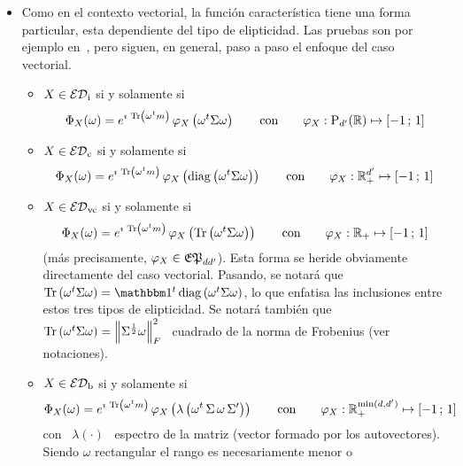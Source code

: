 \begin{itemize}
%
\item Como  en el  contexto vectorial, la  funci\'on caracter\'istica  tiene una
  forma particular,  esta dependiente del  tipo de elipticidad. Las  pruebas son
  por ejemplo  en~\cite{FanChe84, JenGoo81, GupNag99}, pero  siguen, en general,
  paso a paso el enfoque del caso vectorial.
  \begin{itemize}
  \item $X \in \mathcal{ED}_{\mathrm{i}}$  si y solamente si
  \[
  \Phi_X(\omega) = e^{\imath \, \operatorname{Tr}\left( \omega^t m \right)} \, \varphi_X\left(
    \omega^t   \Sigma  \omega  \right)   \qquad  \mbox{con}   \qquad  \varphi_X:
  \mathrm{P}_{d'}(\mathbb{R}) \mapsto [-1 \, ; \, 1]
  \]
  \item  $X \in \mathcal{ED}_{\mathrm{c}}$ si y solamente si
  \[
  \Phi_X(\omega) = e^{\imath \, \operatorname{Tr}\left( \omega^t m \right)} \, \varphi_X\left(
    \operatorname{diag}\left( \omega^t \Sigma \omega  \right) \right) \qquad \mbox{con} \qquad
  \varphi_X: \mathbb{R}_+^{d'} \mapsto [-1 \, ; \, 1]
  \]
  \item  $X \in \mathcal{ED}_{\mathrm{vc}}$ si y solamente si
  \[
  \Phi_X(\omega) = e^{\imath \, \operatorname{Tr}\left( \omega^t m \right)} \, \varphi_X\left(
    \operatorname{Tr}\left( \omega^t  \Sigma \omega  \right) \right) \qquad  \mbox{con} \qquad
  \varphi_X: \mathbb{R}_+ \mapsto [-1 \, ; \, 1]
  \]
  (m\'as  precisamente, $\varphi_X  \in \mathfrak{EP}_{d  d'}$).  Esta  forma  se heride
  obviamente  directamente  del  caso   vectorial.   Pasando,  se  notar\'a  que
  $\Tr\left( \omega^t \Sigma \omega  \right) = \un^t \diag\left( \omega^t \Sigma
    \omega \right)$, lo  que enfatisa las inclusiones entre  estos tres tipos de
  elipticidad. Se  notar\'a tambi\'en que  \ $\operatorname{Tr}\left( \omega^t  \Sigma \omega
  \right) = \left\| \Sigma^{\frac12} \omega \right\|_F^2$ \ cuadrado de la norma
  de Frobenius (ver notaciones).
  \item $X \in \mathcal{ED}_{\mathrm{b}}$  si y solamente si
  \[
  \Phi_X(\omega) = e^{\imath \, \operatorname{Tr}\left( \omega^t m \right)} \, \varphi_X\left(
    \lambda\left( \omega^t \, \Sigma \, \omega \, \Sigma' \right) \right) \qquad
  \mbox{con} \qquad \varphi_X: \mathbb{R}_+^{\min(d,d')} \mapsto [-1 \, ; \, 1]
  \]
  con  \  $\lambda(\cdot)$ \  espectro  de la  matriz  (vector  formado por  los
  autovectores). Siendo $\omega$ rectangular  el rango es necesariamente menor o

\end{itemize}
\end{itemize}
